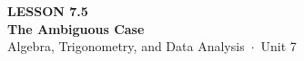 \documentclass[aspectratio=169, 11pt]{beamer}
\begin{document}
{
\begin{frame}[plain]
  \vspace{2.8cm}\hspace{0.55cm}%
  \begin{minipage}{0.9\textwidth}
    {\color{goldacc}\bfseries\small LESSON 7.5}\\[0.5cm]
    {\color{white}\bfseries\LARGE The Ambiguous Case}\\[1.2cm]
    {\color{mistmid}\small Algebra, Trigonometry, and Data Analysis~$\cdot$~Unit 7}
  \end{minipage}
\end{frame}
}

\begin{frame}[t, plain]
\end{frame}
\end{document}
